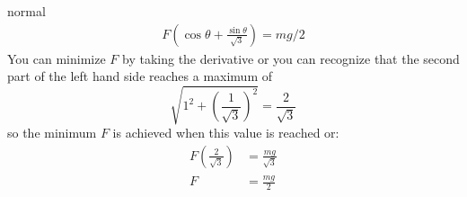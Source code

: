 \begin{solution}{normal}
\begin{align*}
F\left(\cos\theta + \frac{\sin\theta}{\sqrt{3}}\right) = mg/2
\end{align*}
You can minimize $F$ by taking the derivative or you can recognize that the second part of the left hand side reaches a maximum of
$$\sqrt{1^2+\left(\frac{1}{\sqrt{3}}\right)^2}=\frac{2}{\sqrt{3}}$$so the minimum $F$ is achieved when this value is reached or:
\begin{align*}
F\left(\frac{2}{\sqrt{3}}\right) &= \frac{mg}{\sqrt{3}} \\
F &= \frac{mg}{2}
\end{align*}
\end{solution}
